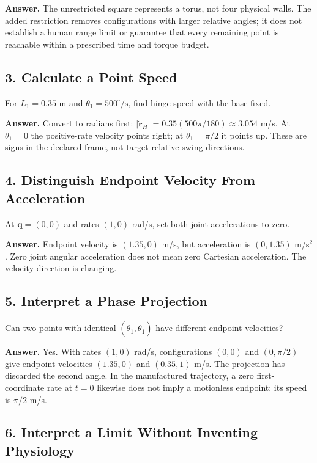 \textbf{Answer.} The unrestricted square represents a torus, not four physical walls. The added restriction removes configurations with larger relative angles; it does not establish a human range limit or guarantee that every remaining point is reachable within a prescribed time and torque budget.

\subsection*{3. Calculate a Point Speed}\label{ch02:calculate-a-point-speed}

For \(L_1=0.35\) m and \(\dot\theta_1=500^\circ/\mathrm{s}\), find hinge speed with the base fixed.

\textbf{Answer.} Convert to radians first: \(|\dot{\bm r}_H|=0.35(500\pi/180)\approx3.054\) m/s. At \(\theta_1=0\) the positive-rate velocity points right; at \(\theta_1=\pi/2\) it points up. These are signs in the declared frame, not target-relative swing directions.

\subsection*{4. Distinguish Endpoint Velocity From Acceleration}\label{ch02:distinguish-endpoint-velocity-from-acceleration}

At \(\bm q=(0,0)\) and rates \((1,0)\) rad/s, set both joint accelerations to zero.

\textbf{Answer.} Endpoint velocity is \((1.35,0)\) m/s, but acceleration is \((0,1.35)\) m/s\(^2\). Zero joint angular acceleration does not mean zero Cartesian acceleration. The velocity direction is changing.

\subsection*{5. Interpret a Phase Projection}\label{ch02:interpret-a-phase-projection}

Can two points with identical \((\theta_1,\dot\theta_1)\) have different endpoint velocities?

\textbf{Answer.} Yes. With rates \((1,0)\) rad/s, configurations \((0,0)\) and \((0,\pi/2)\) give endpoint velocities \((1.35,0)\) and \((0.35,1)\) m/s. The projection has discarded the second angle. In the manufactured trajectory, a zero first-coordinate rate at \(t=0\) likewise does not imply a motionless endpoint: its speed is \(\pi/2\) m/s.

\subsection*{6. Interpret a Limit Without Inventing Physiology}\label{ch02:interpret-a-limit-without-inventing-physiology}

